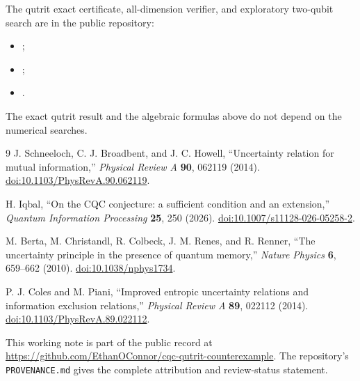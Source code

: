 The qutrit exact certificate, all-dimension verifier, and exploratory two-qubit search are in the public repository:
\begin{itemize}
\item {};
\item {};
\item {}.
\end{itemize}
The exact qutrit result and the algebraic formulas above do not depend on the numerical searches.

\begin{thebibliography}{9}
J. Schneeloch, C. J. Broadbent, and J. C. Howell,
``Uncertainty relation for mutual information,''
\emph{Physical Review A} \textbf{90}, 062119 (2014).
\href{https://doi.org/10.1103/PhysRevA.90.062119}{doi:10.1103/PhysRevA.90.062119}.

H. Iqbal,
``On the CQC conjecture: a sufficient condition and an extension,''
\emph{Quantum Information Processing} \textbf{25}, 250 (2026).
\href{https://doi.org/10.1007/s11128-026-05258-2}{doi:10.1007/s11128-026-05258-2}.

M. Berta, M. Christandl, R. Colbeck, J. M. Renes, and R. Renner,
``The uncertainty principle in the presence of quantum memory,''
\emph{Nature Physics} \textbf{6}, 659--662 (2010).
\href{https://doi.org/10.1038/nphys1734}{doi:10.1038/nphys1734}.

P. J. Coles and M. Piani,
``Improved entropic uncertainty relations and information exclusion relations,''
\emph{Physical Review A} \textbf{89}, 022112 (2014).
\href{https://doi.org/10.1103/PhysRevA.89.022112}{doi:10.1103/PhysRevA.89.022112}.
\end{thebibliography}

\vfill
{\footnotesize\color{cqcgray}
This working note is part of the public record at
\url{https://github.com/EthanOConnor/cqc-qutrit-counterexample}.
The repository's \texttt{PROVENANCE.md} gives the complete attribution and review-status statement.
}
